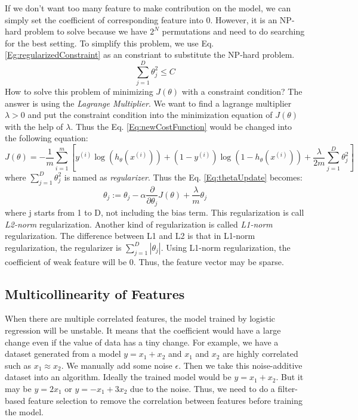 If we don't want too many feature to make contribution on the model, we can simply set the coefficient of corresponding feature into 0. However, it is an NP-hard problem to solve because we have $2^N$ permutations and need to do searching for the best setting. To simplify this problem, we use Eq. \ref{Eg:regularizedConstraint} as an constriant to substitute the NP-hard problem.
\begin{equation} \label{Eg:regularizedConstraint}
\sum_{j=1}^D{\theta_j^2}\leq{C}
\end{equation}
How to solve this problem of minimizing $J(\theta)$ with a constraint condition? The answer is using the \textit{Lagrange Multiplier}\cite{bertsekas2014constrained}. We want to find a lagrange multiplier $\lambda>0$ and put the constraint condition into the minimization equation of $J(\theta)$ with the help of $\lambda$. Thus the Eq. \ref{Eq:newCostFunction} would be changed into the following equation:
\begin{equation} \label{regularizedCostFunction}
J(\theta)=-\frac{1}{m}\sum_{i=1}^m{[y^{(i)}\log{(h_{\theta}(x^{(i)}))}+(1-y^{(i)})\log(1-h_{\theta}(x^{(i)})) + \frac{\lambda}{2m}\sum_{j=1}^D{\theta_j^2}]}
\end{equation}
where $\sum_{j=1}^D{\theta_j^2}$ is named as \textit{regularizer}. Thus the Eq. \ref{Eq:thetaUpdate} becomes:
\begin{equation}
\label{thetaUpdateRegularized}
\theta_j := \theta_j - \alpha \frac{\partial}{\partial\theta_j}J(\theta)+\frac{\lambda}{m}\theta_j
\end{equation}
where j starts from 1 to D, not including the bias term. This regularization is call \textit{L2-norm} regularization. Another kind of regularization is called \textit{L1-norm} regularization. The difference between L1 and L2 is that in L1-norm regularization, the regularizer is $\sum_{j=1}^D{|\theta_j|}$. Using L1-norm regularization, the coefficient of weak feature will be 0. Thus, the feature vector may be sparse\cite{ng2004feature}.

\subsection{Multicollinearity of Features}
When there are multiple correlated features, the model trained by logistic regression will be unstable\cite{farrar1967multicollinearity}. It means that the coefficient would have a large change even if the value of data has a tiny change. For example, we have a dataset generated from a model $y=x_1+x_2$ and $x_1$ and $x_2$ are highly correlated such as $x_1\approx x_2$. We manually add some noise $\epsilon$. Then we take this noise-additive dataset into an algorithm. Ideally the trained model would be $y=x_1+x_2$. But it may be $y=2x_1$ or $y=-x_1+3x_2$ due to the noise. Thus, we need to do a filter-based feature selection to remove the correlation between features before training the model.

